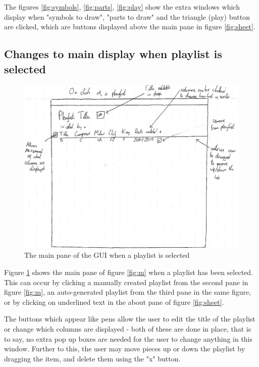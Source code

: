 \begin{appendices}
\begin{figure}[H]
\begin{minipage}{160pt}
\end{minipage}
\end{figure}
The figures \ref{fig:symbols}, \ref{fig:parts}, \ref{fig:play} show the extra windows which display when "symbols to draw", "parts to draw" and the triangle (play) button are clicked, which are buttons displayed above the main pane in figure \ref{fig:sheet}.

\subsection{Changes to main display when playlist is selected}
\begin{figure}[H]
	\includegraphics[width=500pt]{designs/playlist}
	\caption{The main pane of the GUI when a playlist is selected}
	\label{fig:playlist}
\end{figure}
Figure \ref{fig:playlist} shows the main pane of figure \ref{fig:m} when a playlist has been selected. This can occur by clicking a manually created playlist from the second pane in figure \ref{fig:m}, an auto-generated playlist from the third pane in the same figure, or by clicking on underlined text in the about pane of figure \ref{fig:sheet}.

The buttons which appear like pens allow the user to edit the title of the playlist or change which columns are displayed - both of these are done in place, that is to say, no extra pop up boxes are needed for the user to change anything in this window. Further to this, the user may move pieces up or down the playlist by dragging the item, and delete them using the "x" button.


\end{appendices}
